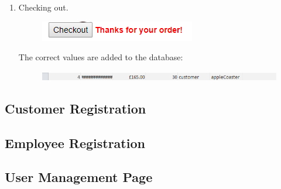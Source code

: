 ﻿\documentclass{article}
\begin{document}
\begin{enumerate}
        \item Checking out.
        \begin{figure}[H]
            \includegraphics{testing/cart2.png}
            \centering
        \end{figure}
        The correct values are added to the database:
        \begin{figure}[H]
            \includegraphics{testing/cart3.png}
            \centering
        \end{figure}
    \end{enumerate}
    \newpage
    \subsection{Customer Registration}
    \newpage
    \subsection{Employee Registration}
    \newpage
    \subsection{User Management Page}
    \newpage
\end{document}

